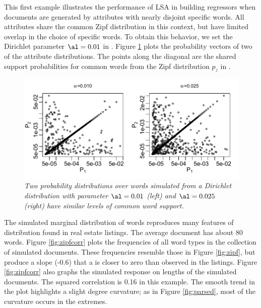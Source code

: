 \documentclass[12pt]{article}
\begin{document}
This first example illustrates the performance of LSA in building regressors when documents are generated by attributes with nearly disjoint specific words.  All attributes share the common Zipf distribution in this context, but have limited overlap in the choice of specific words.  To obtain this behavior, we set the Dirichlet parameter $\al = 0.01$ in .   Figure \ref{fig:P} plots the probability vectors of two of the attribute distributions.  The points along the diagonal are the shared support probabilities for common words from the Zipf distribution $p_z$ in .


\begin{figure}
\caption{ \label{fig:P}
{ \sl  Two probability distributions over words simulated from a Dirichlet distribution with parameter $\al = 0.01$ (left) and $\al = 0.025$ (right) have similar levels of common word support.}}
 \centerline{
 \vspace{0.1in}
 \includegraphics[width=7.5in]{figures/P} }
 \end{figure}


The simulated marginal distribution of words reproduces many features of distribution found in real estate listings.  The average document has about 80 words.  Figure \ref{fig:zipfcorr} plots the frequencies of all word types in the collection of simulated documents.  These frequencies resemble those in Figure \ref{fig:zipf}, but produce a slope (-0.6) that a is closer to zero than observed in the listings.  Figure \ref{fig:zipfcorr} also graphs the simulated response on lengths of the simulated documents.  The squared correlation is 0.16 in this example.  The smooth trend in the plot highlights a slight degree curvature; as in Figure \ref{fig:parsed}, most of the curvature occurs in the extremes.
\end{document}
